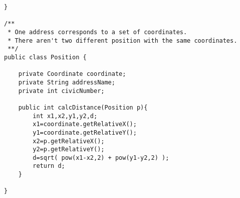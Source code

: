 \begin{lstlisting}
}

/**
 * One address corresponds to a set of coordinates.
 * There aren't two different position with the same coordinates.
 **/
public class Position {

    private Coordinate coordinate;
    private String addressName;
    private int civicNumber;
    
    public int calcDistance(Position p){
        int x1,x2,y1,y2,d;
        x1=coordinate.getRelativeX();
        y1=coordinate.getRelativeY();
        x2=p.getRelativeX();
        y2=p.getRelativeY();
        d=sqrt( pow(x1-x2,2) + pow(y1-y2,2) );
        return d;
    }
    
}

\end{lstlisting}